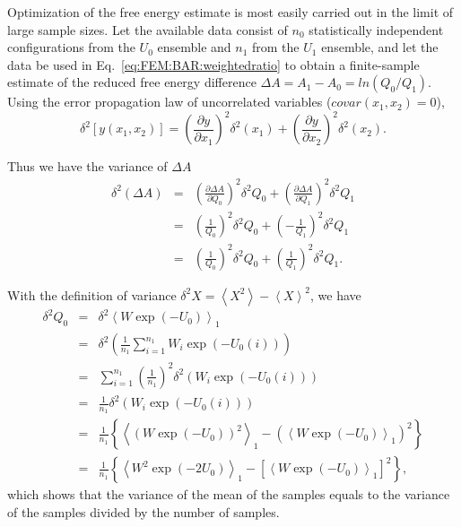 Optimization of the free energy estimate is most easily carried out in the limit of large sample sizes. Let the available data consist
of $n_{0}$ statistically independent configurations from the $U_{0}$ ensemble and $n_{1}$ from the $U_{1}$ ensemble, and let the data
be used in Eq.~\ref{eq:FEM:BAR:weightedratio} to obtain a finite-sample estimate of the reduced free energy difference $\Delta A=A_{1}-A_{0}=ln(Q_{0}/Q_{1})$.
Using the error propagation law of uncorrelated variables ($covar(x_1,x_2)=0$),\cite{BerendsenBook2011}
\begin{equation}
	\delta^2\left[y(x_{1},x_{2})\right]=\left(\frac{\partial y}{\partial x_{1}}\right)^{2}\delta^2(x_{1})+\left(\frac{\partial y}{\partial x_{2}}\right)^{2}\delta^2(x_{2}).
\end{equation}

Thus we have the variance of $\Delta A$
\begin{eqnarray}
	\delta^2(\Delta A) & = & \left(\frac{\partial\Delta A}{\partial Q_{0}}\right)^{2}\delta^2Q_0+\left(\frac{\partial\Delta A}{\partial Q_{1}}\right)^{2}\delta^2Q_1\\
	& = & (\frac{1}{Q_{0}})^{2}\delta^2Q_0+(-\frac{1}{Q_{1}})^{2}\delta^2Q_1\\
	& = & (\frac{1}{Q_{0}})^{2}\delta^2Q_0+(\frac{1}{Q_{1}})^{2}\delta^2Q_1.
\end{eqnarray}

With the definition of variance $\delta^2X=\left\langle X^{2}\right\rangle -\left\langle X\right\rangle ^{2}$,
we have 
\begin{eqnarray}
	\delta^2Q_0 & = & \delta^2\left\langle W\exp{(-U_{0})}\right\rangle_{1}\\
	& = & \delta^2\left(\frac{1}{n_1}\sum_{i=1}^{n_1}W_{i}\exp{\left(-U_{0}(i)\right)}\right)\\
	& = & \sum_{i=1}^{n_{1}}\left(\frac{1}{n_{1}}\right)^{2}\delta^2\left(W_{i}\exp{\left(-U_{0}(i)\right)}\right)\\
	& = & \frac{1}{n_{1}}\delta^2\left(W_{i}\exp{\left(-U_{0}(i)\right)}\right)\\
	& = & \frac{1}{n_{1}}\left\{ \left\langle \left(W\exp{(-U_{0})}\right)^{2}\right\rangle _{1}-\left(\left\langle W\exp{(-U_{0})}\right\rangle _{1}\right)^{2}\right\} \\
	& = & \frac{1}{n_{1}}\left\{ \left< W^{2}\exp{(-2U_{0})}\right>_{1}-\left[\left< W\exp{(-U_{0})}\right>_{1}\right]^{2}\right\},
\end{eqnarray}
which shows that the variance of the mean of the samples equals to the variance of the samples divided by the number of samples.


